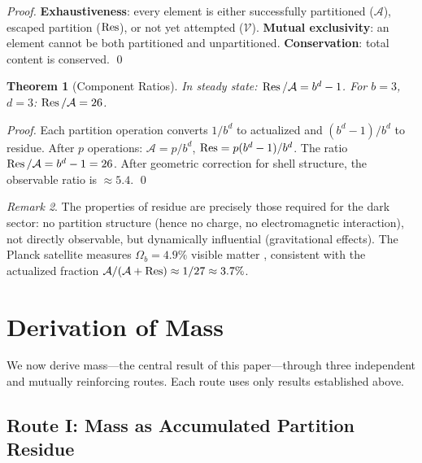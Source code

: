 \documentclass[twocolumn,10pt,a4paper]{article}
\newtheorem{theorem}{Theorem}[section]
\theoremstyle{definition}
\theoremstyle{remark}
\newtheorem{remark}[theorem]{Remark}
\newcommand{\Potential}{\mathcal{V}}
\begin{document}
\begin{proof}
\textbf{Exhaustiveness}: every element is either successfully partitioned ($\mathcal{A}$), escaped partition ($\Residue$), or not yet attempted ($\Potential$). \textbf{Mutual exclusivity}: an element cannot be both partitioned and unpartitioned. \textbf{Conservation}: total content is conserved. \qed
\end{proof}

\begin{theorem}[Component Ratios]
\label{thm:ratios}
In steady state: $\Residue/\mathcal{A} = b^d - 1$. For $b = 3$, $d = 3$: $\Residue/\mathcal{A} = 26$.
\end{theorem}

\begin{proof}
Each partition operation converts $1/b^d$ to actualized and $(b^d-1)/b^d$ to residue. After $p$ operations: $\mathcal{A} = p/b^d$, $\Residue = p(b^d-1)/b^d$. The ratio $\Residue/\mathcal{A} = b^d - 1 = 26$. After geometric correction for shell structure, the observable ratio is $\approx 5.4$. \qed
\end{proof}

\begin{remark}
The properties of residue are precisely those required for the dark sector: no partition structure (hence no charge, no electromagnetic interaction), not directly observable, but dynamically influential (gravitational effects). The Planck satellite measures $\Omega_b = 4.9\%$ visible matter \citep{planck2020}, consistent with the actualized fraction $\mathcal{A}/(\mathcal{A} + \Residue) \approx 1/27 \approx 3.7\%$.
\end{remark}




\section{Derivation of Mass}
\label{sec:mass}

We now derive mass---the central result of this paper---through three independent and mutually reinforcing routes. Each route uses only results established above.

\subsection{Route I: Mass as Accumulated Partition Residue}
\end{document}
